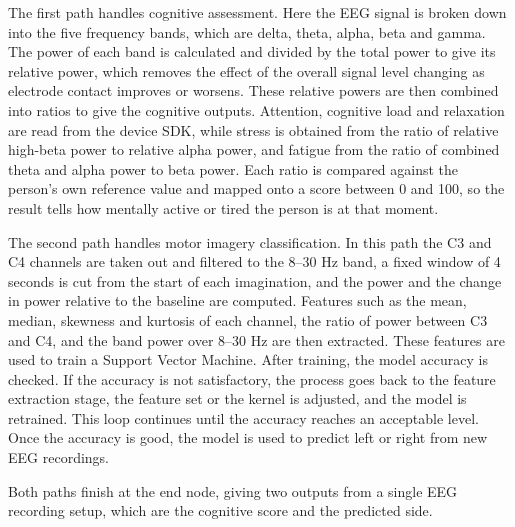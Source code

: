 The first path handles cognitive assessment. Here the EEG signal is broken down into the
five frequency bands, which are delta, theta, alpha, beta and gamma. The power of each band
is calculated and divided by the total power to give its relative power, which removes the
effect of the overall signal level changing as electrode contact improves or worsens. These
relative powers are then combined into ratios to give the cognitive outputs. Attention,
cognitive load and relaxation are read from the device SDK, while stress is obtained from
the ratio of relative high-beta power to relative alpha power, and fatigue from the ratio
of combined theta and alpha power to beta power. Each ratio is compared against the
person's own reference value and mapped onto a score between 0 and 100, so the result tells
how mentally active or tired the person is at that moment.

The second path handles motor imagery classification. In this path the C3 and C4 channels
are taken out and filtered to the 8--30 Hz band, a fixed window of 4 seconds is cut from
the start of each imagination, and the power and the change in power relative to the
baseline are computed. Features such as the mean, median, skewness and kurtosis of each
channel, the ratio of power between C3 and C4, and the band power over 8--30 Hz are then
extracted. These features are used to train a Support Vector Machine. After training, the
model accuracy is checked. If the accuracy is not satisfactory, the process goes back to
the feature extraction stage, the feature set or the kernel is adjusted, and the model is
retrained. This loop continues until the accuracy reaches an acceptable level. Once the
accuracy is good, the model is used to predict left or right from new EEG recordings.

Both paths finish at the end node, giving two outputs from a single EEG recording setup,
which are the cognitive score and the predicted side.